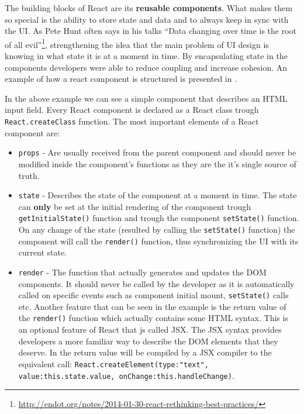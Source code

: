 The building blocks of React are its \textbf{reusable components}. What makes them so special is the ability to store state and data and to always keep in sync with the UI. As Pete Hunt often says in his talks ``Data changing over time is the root of all evil''\footnote{\url{http://endot.org/notes/2014-01-30-react-rethinking-best-practices/}}, strengthening the idea that the main problem of UI design is knowing in what state it is at a moment in time. By encapsulating state in the components developers were able to reduce coupling and increase cohesion. An example of how a react component is structured is presented in .



In the above example we can see a simple component that describes an HTML input field. Every React component is declared as a React class trough \texttt{React.createClass} function. The most important elements of a React component are:
\begin{itemize}
	\item \texttt{props} - Are usually received from the parent component and should never be modified inside the component's functions as they are the it's single source of truth.
	\item \texttt{state} - Describes the state of the component at a moment in time. The state can \textbf{only} be set at the initial rendering of the component trough \texttt{getInitialState()} function and trough the component \texttt{setState()} function. On any change of the state (resulted by calling the \texttt{setState()} function) the component will call the \texttt{render()} function, thus synchronizing the UI with its current state.
	\item \texttt{render} - The function that actually generates and updates the DOM components. It should never be called by the developer as it is automatically called on specific events such as component initial mount, \texttt{setState()} calls etc. Another feature that can be seen in the example is the return value of the \texttt{render()} function which actually contains some HTML syntax. This is an optional feature of React that js called JSX. The JSX syntax provides developers a more familiar way to describe the DOM elements that they deserve. In  the return value will be compiled by a JSX compiler to the equivalent call:
	\texttt{React.createElement(type:"text", value:this.state.value, onChange:this.handleChange)}.
\end{itemize}

